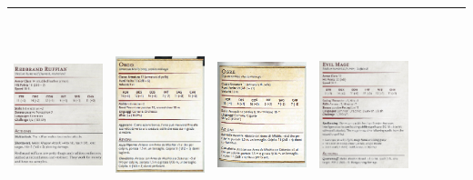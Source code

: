 \documentclass{article}
\begin{document}
\begin{table}[h]
\begin{tabular}{cr|cr|cr|cr}
            \includegraphics[width=4cm,height = 6cm]{../Mostri/Marchi Rossi.PNG} &  \includegraphics[width=4cm,height = 6cm]{../Mostri/Orco.PNG}& \includegraphics[width=4cm,height = 6cm]{../Mostri/Ogre.png}& \includegraphics[width=4cm,height = 6cm]{../Mostri/HalmunKost.png} \\
              \hline
          
    \end{tabular}
    
   
    
\end{table}
\end{document}
